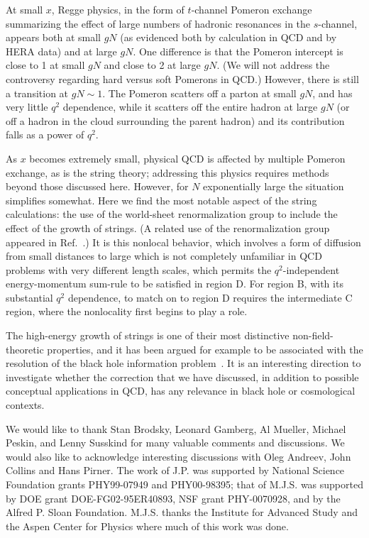 At small $x$, Regge physics, in the form of $t$-channel
Pomeron exchange summarizing
the effect of large numbers of hadronic resonances in the $s$-channel,
appears both at small $gN$ (as evidenced
both by calculation in QCD and by HERA data) and at large $gN$.  One
difference is that the Pomeron intercept is
close to 1 at small $gN$ and close to 2 at
large $gN$.  (We will not address the controversy regarding hard versus
soft Pomerons in QCD.)  However, there is still a transition at $gN\sim 1$.
The Pomeron scatters off a parton at small $gN$, and has very little
$q^2$ dependence, while it scatters off the entire hadron at large $gN$ (or
off a hadron in the cloud surrounding the parent hadron) and its
contribution falls as 
a power of $q^2$.

As $x$ becomes extremely small, physical
QCD is affected by multiple Pomeron exchange, as is the string theory;
addressing this physics requires methods beyond those discussed
here.  However, for $N$ exponentially large the situation simplifies somewhat.
Here we find the most notable aspect of the string calculations: the
use of the world-sheet renormalization group to include the effect of the
growth of strings.  (A related use of the renormalization group appeared in
Ref.~\cite{size}.)  It is this nonlocal behavior, which involves a form of diffusion from 
small distances to large which is not completely unfamiliar in QCD problems
with very different length scales, which permits the $q^2$-independent
energy-momentum sum-rule to be satisfied in region D.  For region B,
with its substantial $q^2$ dependence, to match on to region D requires
the intermediate C region, where the nonlocality first begins to play a role.

The high-energy growth of strings is one of their most
distinctive non-field-theoretic properties, and it has been argued for
example to be associated with the resolution of the black hole information
problem~\cite{growth}.  It is an interesting direction to investigate 
whether the
correction that we have discussed, in addition to possible conceptual
applications in QCD, has any relevance in black hole or
cosmological contexts.  



\vskip 1.0in

We would like to thank Stan Brodsky, 
Leonard Gamberg, Al Mueller, Michael Peskin, and Lenny
Susskind for many valuable comments and discussions.  We would also
like to acknowledge interesting discussions with Oleg Andreev, John Collins and Hans Pirner.
The work of J.P. was supported by National Science
Foundation grants PHY99-07949 and PHY00-98395; that of M.J.S.  was
supported by DOE grant DOE-FG02-95ER40893, NSF grant PHY-0070928, and
by the Alfred P. Sloan Foundation.  M.J.S. thanks the Institute for
Advanced Study and the Aspen Center for Physics where much of this
work was done.


